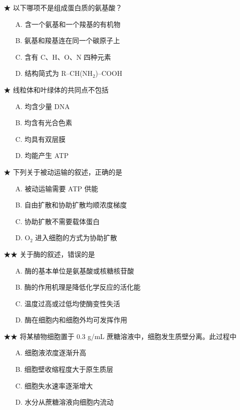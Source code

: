 \begin{enumerate}
  \item[★] 以下哪项不是组成蛋白质的氨基酸？
  \begin{enumerate}
    \item[A.] 含一个氨基和一个羧基的有机物
    \item[B.] 氨基和羧基连在同一个碳原子上
    \item[C.] 含有 C、H、O、N 四种元素
    \item[D.] 结构简式为 R--CH(NH$_2$)--COOH
  \end{enumerate}
  \vspace{0.8cm}

  \item[★] 线粒体和叶绿体的共同点不包括
  \begin{enumerate}
    \item[A.] 均含少量 DNA
    \item[B.] 均含有光合色素
    \item[C.] 均具有双层膜
    \item[D.] 均能产生 ATP
  \end{enumerate}
  \vspace{0.8cm}

  \item[★] 下列关于被动运输的叙述，正确的是
  \begin{enumerate}
    \item[A.] 被动运输需要 ATP 供能
    \item[B.] 自由扩散和协助扩散均顺浓度梯度
    \item[C.] 协助扩散不需要载体蛋白
    \item[D.] O$_2$ 进入细胞的方式为协助扩散
  \end{enumerate}
  \vspace{0.8cm}

  \item[★★] 关于酶的叙述，错误的是
  \begin{enumerate}
    \item[A.] 酶的基本单位是氨基酸或核糖核苷酸
    \item[B.] 酶的作用机理是降低化学反应的活化能
    \item[C.] 温度过高或过低均使酶变性失活
    \item[D.] 酶在细胞内和细胞外均可发挥作用
  \end{enumerate}
  \vspace{0.8cm}

  \item[★★] 将某植物细胞置于 0.3 g/mL 蔗糖溶液中，细胞发生质壁分离。此过程中
  \begin{enumerate}
    \item[A.] 细胞液浓度逐渐升高
    \item[B.] 细胞壁收缩程度大于原生质层
    \item[C.] 细胞失水速率逐渐增大
    \item[D.] 水分从蔗糖溶液向细胞内流动
  \end{enumerate}
  \vspace{0.8cm}


\end{enumerate}
